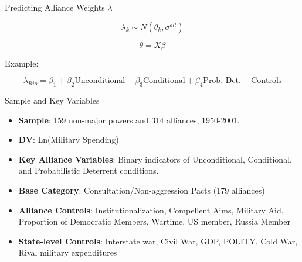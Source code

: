 \documentclass{beamer}
\begin{document}
 
\begin{frame}{Predicting Alliance Weights $\lambda$}
 

\begin{equation*}
\lambda_k \sim N(\theta_k , \sigma^{all})
\end{equation*} 

\pause

\begin{equation*}
\theta = X \beta
\end{equation*}

\pause 

Example:

\begin{equation*}
\lambda_{Rio} = \beta_1 + \beta_2 \mbox{Unconditional} + \beta_3 \mbox{Conditional} + \beta_4 \mbox{Prob. Det.} + \mbox{Controls}
\end{equation*}


\end{frame}


\begin{frame}{Sample and Key Variables}

\begin{itemize}
\item \textbf{Sample}: 159 non-major powers and 314 alliances, 1950-2001. 
\pause 
\item \textbf{DV}: Ln(Military Spending) 
\pause
\item \textbf{Key Alliance Variables}: Binary indicators of Unconditional, Conditional, and Probabilistic Deterrent conditions. 
\pause
\item \textbf{Base Category}: Consultation/Non-aggression Pacts (179 alliances)
\pause
\item \textbf{Alliance Controls}: Institutionalization, Compellent Aims, Military Aid, Proportion of Democratic Members, Wartime, US member, Russia Member
\pause
\item \textbf{State-level Controls}: Interstate war, Civil War, GDP, POLITY, Cold War, Rival military expenditures

\end{itemize} 



\end{frame}

\end{document}
